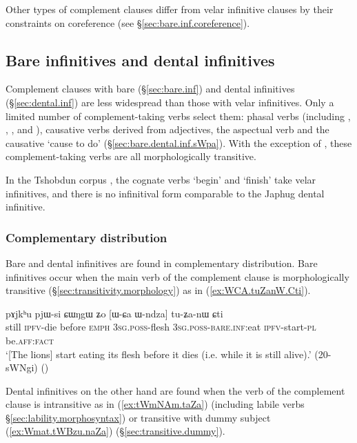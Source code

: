 Other types of complement clauses differ from velar infinitive clauses by their constraints on coreference (see §\ref{sec:bare.inf.coreference}).

 \subsection{Bare infinitives and dental infinitives} \label{sec:bare.dental.inf}
Complement clauses with bare (§\ref{sec:bare.inf}) and dental infinitives (§\ref{sec:dental.inf}) are less widespread than those with velar infinitives. Only a limited number of complement-taking verbs select them: phasal verbs (including , , , and ), causative verbs derived from adjectives, the aspectual verb  and the causative  `cause to do' (§\ref{sec:bare.dental.inf.sWpa}). With the exception of , these complement-taking verbs are all morphologically transitive.

In the Tshobdun corpus \citet{jackson19tshobdun}, the cognate verbs  `begin'  and  `finish' take velar infinitives, and there is no infinitival form comparable to the Japhug dental infinitive.

\subsubsection{Complementary distribution} \label{sec:bare.inf.dental.complementary}
Bare and dental infinitives are found in complementary distribution. Bare infinitives occur when the main verb of the complement clause is morphologically transitive (§\ref{sec:transitivity.morphology}) as in (\ref{ex:WCA.tuZanW.Cti}).

\begin{exe} 
\ex \label{ex:WCA.tuZanW.Cti}
\gll pɤjkʰu pjɯ-si ɕɯŋgɯ ʑo [ɯ-ɕa ɯ-ndza] tu-ʑa-nɯ ɕti \\
still \textsc{ipfv}-die before \textsc{emph} \textsc{3sg}.\textsc{poss}-flesh \textsc{3sg}.\textsc{poss}-\textsc{bare}.\textsc{inf}:eat \textsc{ipfv}-start-\textsc{pl} be.\textsc{aff}:\textsc{fact} \\
\glt `[The lions] start eating its flesh before it dies (i.e. while it is still alive).' (20-sWNgi)
()
  \end{exe} 

Dental infinitives on the other hand are  found when the verb of the complement clause is intransitive as in (\ref{ex:tWmNAm.taZa}) (including labile verbs §\ref{sec:lability.morphosyntax}) or transitive with dummy subject (\ref{ex:Wmat.tWBzu.naZa}) (§\ref{sec:transitive.dummy}).

